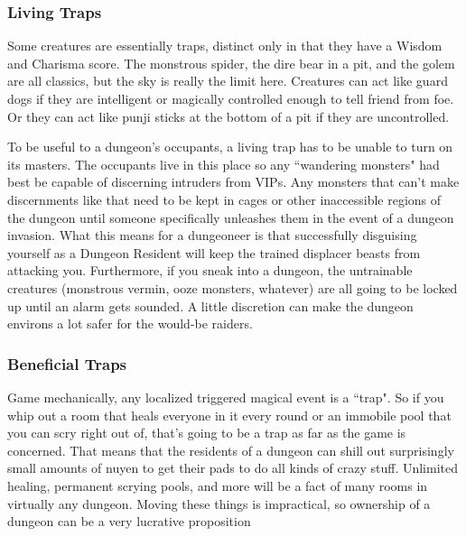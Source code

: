 \subsubsection{Living Traps}

Some creatures are essentially traps, distinct only in that they have a Wisdom and Charisma score. The monstrous spider, the dire bear in a pit, and the golem are all classics, but the sky is really the limit here. Creatures can act like guard dogs if they are intelligent or magically controlled enough to tell friend from foe. Or they can act like punji sticks at the bottom of a pit if they are uncontrolled.

To be useful to a dungeon's occupants, a living trap has to be unable to turn on its masters. The occupants live in this place so any ``wandering monsters" had best be capable of discerning intruders from VIPs. Any monsters that can't make discernments like that need to be kept in cages or other inaccessible regions of the dungeon until someone specifically unleashes them in the event of a dungeon invasion. What this means for a dungeoneer is that successfully disguising yourself as a Dungeon Resident will keep the trained displacer beasts from attacking you. Furthermore, if you sneak into a dungeon, the untrainable creatures (monstrous vermin, ooze monsters, whatever) are all going to be locked up until an alarm gets sounded. A little discretion can make the dungeon environs a lot safer for the would-be raiders.

\subsubsection{Beneficial Traps}

Game mechanically, any localized triggered magical event is a ``trap". So if you whip out a room that heals everyone in it every round or an immobile pool that you can scry right out of, that's going to be a trap as far as the game is concerned. That means that the residents of a dungeon can shill out surprisingly small amounts of nuyen to get their pads to do all kinds of crazy stuff. Unlimited healing, permanent scrying pools, and more will be a fact of many rooms in virtually any dungeon. Moving these things is impractical, so ownership of a dungeon can be a very lucrative proposition
